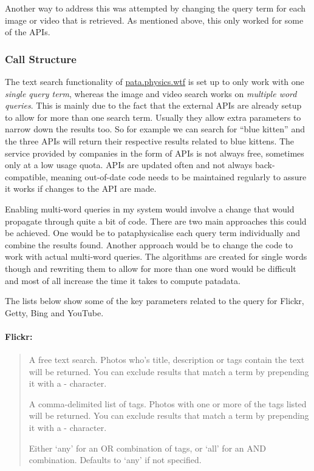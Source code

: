 Another way to address this was attempted by changing the query term for each image or video that is retrieved. As mentioned above, this only worked for some of the \ac{API}s.


\subsubsection{Call Structure}

The text search functionality of \url{pata.physics.wtf} is set up to only work with one \emph{single query term}, whereas the image and video search works on \emph{multiple word queries}. This is mainly due to the fact that the external \ac{API}s are already setup to allow for more than one search term. Usually they allow extra parameters to narrow down the results too. So for example we can search for ``blue kitten'' and the three \ac{API}s will return their respective results related to blue kittens. The service provided by companies in the form of \ac{API}s is not always free, sometimes only at a low usage quota. \ac{API}s are updated often and not always back-compatible, meaning out-of-date code needs to be maintained regularly to assure it works if changes to the \ac{API} are made.

Enabling multi-word queries in my system would involve a change that would propagate through quite a bit of code. There are two main approaches this could be achieved. One would be to pataphysicalise each query term individually and combine the results found. Another approach would be to change the code to work with actual multi-word queries. The algorithms are created for single words though and rewriting them to allow for more than one word would be difficult and most of all increase the time it takes to compute patadata.

The lists below show some of the key parameters related to the query for Flickr, Getty, Bing and YouTube.

\paragraph{Flickr:}
\begin{quotation}
  \begin{description}
  \vspace{-1cm}
    \item[text (Optional)] A free text search. Photos who's title, description or tags contain the text will be returned. You can exclude results that match a term by prepending it with a - character.
    \item[tags (Optional)] A comma-delimited list of tags. Photos with one or more of the tags listed will be returned. You can exclude results that match a term by prepending it with a - character.
    \item[tag\_mode (Optional)] Either `any' for an OR combination of tags, or `all' for an AND combination. Defaults to `any' if not specified.
  \end{description}
\end{quotation}

